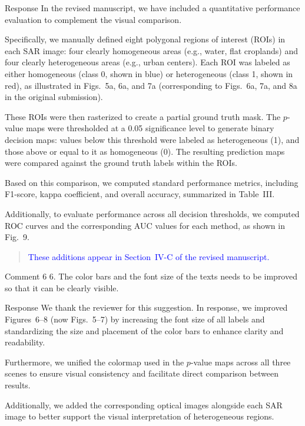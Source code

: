 \documentclass[11pt]{report}
\begin{document}
\begin{responsebox}{Response}
In the revised manuscript, we have included a quantitative performance evaluation to complement the visual comparison.

Specifically, we manually defined eight polygonal regions of interest (ROIs) in each SAR image: four clearly homogeneous areas (e.g., water, flat croplands) and four clearly heterogeneous areas (e.g., urban centers). Each ROI was labeled as either homogeneous (class 0, shown in blue) or heterogeneous (class 1, shown in red), as illustrated in Figs.~5a, 6a, and 7a (corresponding to Figs.~6a, 7a, and 8a in the original submission).

These ROIs were then rasterized to create a partial ground truth mask. The $p$-value maps were thresholded at a 0.05 significance level to generate binary decision maps: values below this threshold were labeled as heterogeneous (1), and those above or equal to it as homogeneous (0). The resulting prediction maps were compared against the ground truth labels within the ROIs.

Based on this comparison, we computed standard performance metrics, including F1-score, kappa coefficient, and overall accuracy, summarized in Table~III.

Additionally, to evaluate performance across all decision thresholds, we computed ROC curves and the corresponding AUC values for each method, as shown in Fig.~9.

\begin{quote}
\textcolor{blue}{These additions appear in Section~IV-C of the revised manuscript.}
\end{quote}
\end{responsebox}


\vspace{9em}


\begin{reviewbox}{Comment 6}
6. The color bars and the font size of the texts needs to be improved so that it can be clearly visible.
\end{reviewbox}

\begin{responsebox}{Response}
We thank the reviewer for this suggestion. In response, we improved Figures~6–8 (now Figs.~5–7) by increasing the font size of all labels and standardizing the size and placement of the color bars to enhance clarity and readability.

Furthermore, we unified the colormap used in the $p$-value maps across all three scenes to ensure visual consistency and facilitate direct comparison between results. 

Additionally, we added the corresponding optical images alongside each SAR image to better support the visual interpretation of heterogeneous regions.

\end{responsebox}
\end{document}
